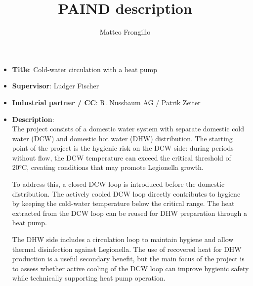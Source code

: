 \documentclass{article}
\title{\textbf{PAIND description}}
\author{Matteo Frongillo}
\date{}
\begin{document}
\maketitle

\begin{itemize}
    \item \textbf{Title}: Cold-water circulation with a heat pump
    \item \textbf{Supervisor}: Ludger Fischer
    \item \textbf{Industrial partner / CC}: R. Nussbaum AG / Patrik Zeiter
    \item \textbf{Description}:\\
        The project consists of a domestic water system with separate domestic cold water (DCW) and domestic hot water (DHW) distribution. The starting point of the project is the hygienic risk on the DCW side: during periods without flow, the DCW temperature can exceed the critical threshold of 20°C, creating conditions that may promote Legionella growth.

        To address this, a closed DCW loop is introduced before the domestic distribution. The actively cooled DCW loop directly contributes to hygiene by keeping the cold-water temperature below the critical range. The heat extracted from the DCW loop can be reused for DHW preparation through a heat pump.

        The DHW side includes a circulation loop to maintain hygiene and allow thermal disinfection against Legionella. The use of recovered heat for DHW production is a useful secondary benefit, but the main focus of the project is to assess whether active cooling of the DCW loop can improve hygienic safety while technically supporting heat pump operation.
\end{itemize}
\end{document}
